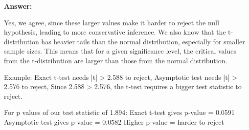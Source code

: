 \documentclass[12pt,a4paper]{article}
\begin{document}
\begin{enumerate}[label=(\alph*)]
  \textbf{Answer:} 

  Yes, we agree, since these larger values make it harder to reject the null hypothesis, leading to more conservative inference. 
  We also know that the t-distribution has heavier tails than the normal distribution, especially for smaller sample sizes. This means that for a given significance level, the critical values from the t-distribution are larger than those from the normal distribution.
  
  Example: Exact t-test needs |t| > 2.588 to reject, Asymptotic test needs |t| > 2.576 to reject, Since 2.588 > 2.576, the t-test requires a bigger test statistic to reject.

  For p values of our test statistic of 1.894:
  Exact t-test gives p-value = 0.0591
  Asymptotic test gives p-value = 0.0582
  Higher p-value = harder to reject
  
\end{enumerate}
\end{document}
